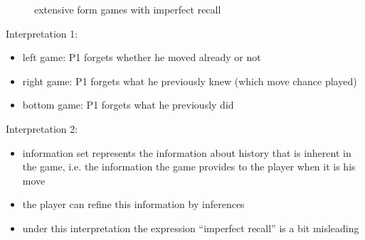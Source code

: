 \documentclass{beamer}    %
\theoremstyle{plain}
\theoremstyle{definition}
\begin{document}
{\begin{figure}[h]
\quad
{}
\caption{extensive form games with imperfect recall}
\end{figure}

\framebreak

Interpretation 1:
\begin{itemize}
\item left game: P1 forgets whether he moved already or not
\item right game: P1 forgets what he previously knew (which move chance played)
\item bottom game: P1 forgets what he previously did
\end{itemize}
Interpretation 2:
\begin{itemize}
\item information set represents the information about history that is inherent in the game, i.e. the information the game provides to the player when it is his move
\item the player can refine this information by inferences%
\item under this interpretation the expression ``imperfect recall'' is a bit misleading
\end{itemize}

}
\end{document}
